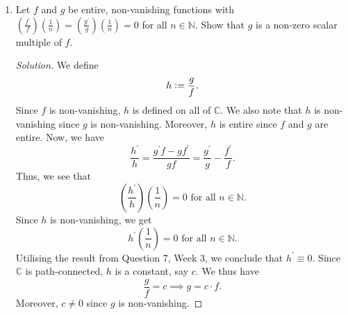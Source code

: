 \documentclass[11pt]{article}
\theoremstyle{definition}
\newenvironment{soln}{\begin{proof}[Solution]}{\end{proof}}
\begin{document}
\begin{enumerate}[leftmargin=*]
    
    \begin{soln}
    Let $f$ be an entire function satisfying $\abs{f(z)} \leq C\abs{z}^n$ for some positive constant $C$ and all $z$ with $\abs{z} > R_0$. We note that $\abs{f}$ is bounded on the set $\left\{ z \in \mathbb{C} \mid \abs{z} \leq R_0 \right\}$ since $f$ is continuous and the latter set is compact. Let $M$ be a bound on $\abs{f}$ on this set. Pick $R > 0$. On $B_R(0)$, we then have
    \[
        \abs{f(z)} \leq \max\left\{ M, CR^n \right\} \leq M + CR^n.
    \]  
    Now, for $m > n$, Cauchy's estimate gives us
        \[
            \abs{f^{(m)}(0)} \leq \frac{m! \cdot (M + CR^n)}{R^m}.
        \]
        Since the above holds for arbitrary $R > 0$, we may let $R \to \infty$. Since $m > n$, we see that $f^{(m)}(0) = 0$ for all $m > n$. Now, since $f$ is entire we may write
        \[
            f(z) = \sum_{k=0}^{\infty} \frac{f^{(k)}(0)}{k!} z^k = \sum_{k=0}^n \frac{f^{(k)}(0)}{k!} z^k,
        \]
        for all $z \in \mathbb{C}$. Hence, $f$ is a polynomial of degree at most $n$.
        
        \medskip
        
        Conversely, suppose $f(z) = a_0 + a_1 z + \cdots + a_nz^n$ is a polynomial of degree at most $n$. Note that
        \[
            \frac{f(z)}{z^n} \to a_n \text{ as } z \to \infty.
        \]
        Thus, there must exist $R > 0$ such that for all $z$ with $\abs{z} > R$, we have
        \[
            \abs{\frac{f(z)}{z^n}} \leq \abs{a_n} + 1.
        \]
        Thus, $C \vcentcolon= \abs{a_n} + 1$ works.
\end{soln}
    
    \item Let $f$ and $g$ be entire, non-vanishing functions with $\displaystyle\left( \frac{f^{\prime}}{f} \right) \left( \frac{1}{n} \right) = \left( \frac{g^{\prime}}{g} \right) \left( \frac{1}{n} \right) = 0$ for all $n \in \mathbb{N}$. Show that $g$ is a non-zero scalar multiple of $f$.
    
    \begin{soln}
        We define 
        \[
            h \vcentcolon= \frac{g}{f}.
        \]
        Since $f$ is non-vanishing, $h$ is defined on all of $\mathbb{C}$. We also note that $h$ is non-vanishing since $g$ is non-vanishing. Moreover, $h$ is entire since $f$ and $g$ are entire. Now, we have
        \[
            \frac{h^{\prime}}{h} = \frac{g^{\prime}f - gf^{\prime}}{gf} = \frac{g^{\prime}}{g} - \frac{f^{\prime}}{f}.
        \]
        Thus, we see that
        \[
            \left(\frac{h^{\prime}}{h}\right) \left( \frac{1}{n} \right) = 0 \text{ for all } n \in \mathbb{N}.
        \]
        Since $h$ is non-vanishing, we get
        \[
           h^{\prime} \left( \frac{1}{n} \right) = 0 \text{ for all } n \in \mathbb{N}.
        \]
        Utilising the result from Question 7, Week 3, we conclude that $h^{\prime} \equiv 0$. Since $\mathbb{C}$ is path-connected, $h$ is a constant, say $c$. We thus have
        \[
            \frac{g}{f} = c \implies g = c \cdot f.
        \]
        Moreover, $c \neq 0$ since $g$ is non-vanishing.
    \end{soln}
\end{enumerate}
\end{document}
